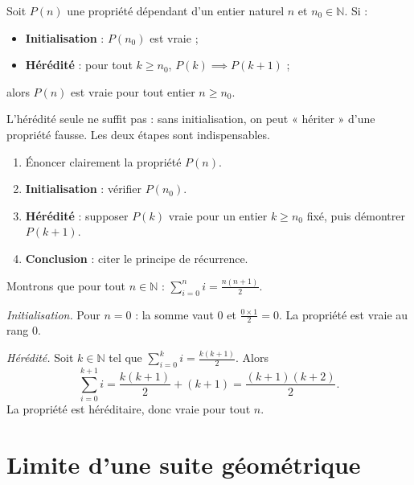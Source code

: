 \begin{definition}
Soit $P(n)$ une propriété dépendant d'un entier naturel $n$ et
$n_0 \in \mathbb{N}$. Si :
\begin{itemize}
  \item \textbf{Initialisation} : $P(n_0)$ est vraie ;
  \item \textbf{Hérédité} : pour tout $k \geq n_0$,
        $P(k) \implies P(k+1)$ ;
\end{itemize}
alors $P(n)$ est vraie pour tout entier $n \geq n_0$.
\end{definition}

\begin{remarque}
L'hérédité seule ne suffit pas : sans initialisation, on peut
« hériter » d'une propriété fausse. Les deux étapes sont
indispensables.
\end{remarque}

\begin{methode}
\begin{enumerate}
  \item Énoncer clairement la propriété $P(n)$.
  \item \textbf{Initialisation} : vérifier $P(n_0)$.
  \item \textbf{Hérédité} : supposer $P(k)$ vraie pour un entier
        $k \geq n_0$ fixé, puis démontrer $P(k+1)$.
  \item \textbf{Conclusion} : citer le principe de récurrence.
\end{enumerate}
\end{methode}

\begin{exemple}
Montrons que pour tout $n \in \mathbb{N}$ :
$\displaystyle\sum_{i=0}^{n} i = \frac{n(n+1)}{2}$.

\emph{Initialisation.} Pour $n=0$ : la somme vaut $0$ et
$\frac{0 \times 1}{2} = 0$. La propriété est vraie au rang $0$.

\emph{Hérédité.} Soit $k \in \mathbb{N}$ tel que
$\sum_{i=0}^{k} i = \frac{k(k+1)}{2}$. Alors
\[
\sum_{i=0}^{k+1} i = \frac{k(k+1)}{2} + (k+1)
= \frac{(k+1)(k+2)}{2}.
\]
La propriété est héréditaire, donc vraie pour tout $n$.
\end{exemple}

\section{Limite d'une suite géométrique}

